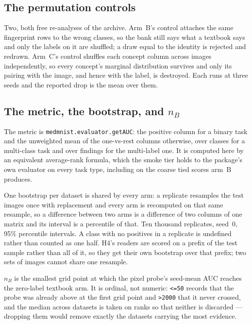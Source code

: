 \documentclass[11pt]{article}
\begin{document}
\subsection{The permutation controls}

Two, both free re-analyses of the archive. Arm~B's control attaches the same fingerprint rows to
the wrong classes, so the bank still says what a textbook says and only the labels on it are
shuffled; a draw equal to the identity is rejected and redrawn. Arm~C's control shuffles each
concept column across images independently, so every concept's marginal distribution survives and
only its pairing with the image, and hence with the label, is destroyed. Each runs at three seeds
and the reported drop is the mean over them.

\subsection{The metric, the bootstrap, and $n_B$}

The metric is \texttt{medmnist.evaluator.getAUC}: the positive column for a binary task and the
unweighted mean of the one-vs-rest columns otherwise, over classes for a multi-class task and over
findings for the multi-label one. It is computed here by an equivalent average-rank formula, which
the smoke tier holds to the package's own evaluator on every task type, including on the coarse
tied scores arm~B produces.

One bootstrap per dataset is shared by every arm: a replicate resamples the test images once with
replacement and every arm is recomputed on that same resample, so a difference between two arms is
a difference of two columns of one matrix and its interval is a percentile of that. Ten thousand
replicates, seed~0, 95\% percentile intervals. A class with no positives in a replicate is
undefined rather than counted as one half. H4's readers are scored on a prefix of the test sample
rather than all of it, so they get their own bootstrap over that prefix; two sets of images cannot
share one resample.

$n_B$ is the smallest grid point at which the pixel probe's seed-mean AUC reaches the zero-label
textbook arm. It is ordinal, not numeric: \texttt{<=50} records that the probe was already above at
the first grid point and \texttt{>2000} that it never crossed, and the median across datasets is
taken on ranks so that neither is discarded --- dropping them would remove exactly the datasets
carrying the most evidence.
\end{document}
